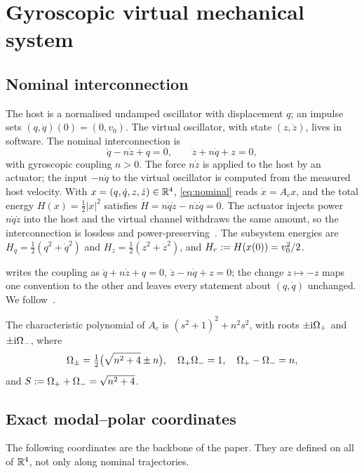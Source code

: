 \section{Gyroscopic virtual mechanical system}\label{sec:model}

\subsection{Nominal interconnection}
The host is a normalised undamped oscillator with displacement $q$; an impulse
sets $(q,\dot q)(0)=(0,v_0)$.
The virtual oscillator, with state $(z,\dot z)$, lives in software.
The nominal interconnection is
\begin{equation}\label{eq:nominal}
  \ddot q - n\dot z + q = 0,\qquad \ddot z + n\dot q + z = 0,
\end{equation}
with gyroscopic coupling $n>0$.
The force $n\dot z$ is applied to the host by an actuator; the input $-n\dot q$ to
the virtual oscillator is computed from the measured host velocity.
With $x=(q,\dot q,z,\dot z)\in\mathbb{R}^4$, \eqref{eq:nominal} reads $\dot x=A_cx$, and
the total energy $H(x)=\tfrac12|x|^2$ satisfies $\dot H=n\dot q\dot z-n\dot z\dot
q=0$.
The actuator injects power $n\dot q\dot z$ into the host and the virtual channel
withdraws the same amount, so the interconnection is lossless and
power-preserving~\citep{vanderschaft2000l2}.
The subsystem energies are $H_q=\tfrac12(q^2+\dot q^2)$ and
$H_z=\tfrac12(z^2+\dot z^2)$, and $H_r:=H(x(0))=v_0^2/2$.

\begin{remark}
\citet{juchem2026shaping} writes the coupling as $\ddot q+n\dot z+q=0$,
$\ddot z-n\dot q+z=0$; the change $z\mapsto-z$ maps one convention to the other
and leaves every statement about $(q,\dot q)$ unchanged.
We follow~\citet{juchem2027restoring}.
\end{remark}

The characteristic polynomial of $A_c$ is $(s^2+1)^2+n^2s^2$, with roots
$\pm\mathrm{i}\Omega_+$ and $\pm\mathrm{i}\Omega_-$, where
\begin{equation}\label{eq:modal-freq}
  \Omega_\pm=\tfrac12\big(\sqrt{n^2+4}\pm n\big),\quad \Omega_+\Omega_-=1,\quad \Omega_+-\Omega_-=n,
\end{equation}
and $S:=\Omega_++\Omega_-=\sqrt{n^2+4}$.

\subsection{Exact modal--polar coordinates}
The following coordinates are the backbone of the paper.
They are defined on all of $\mathbb{R}^4$, not only along nominal trajectories.


